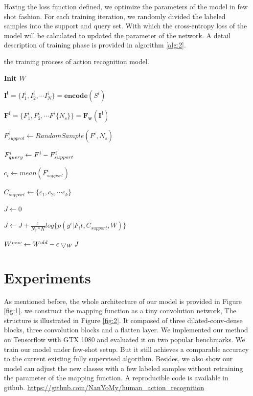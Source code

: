 \documentclass{bmvc2k}
\begin{document}
 Having the loss function defined, we optimize the parameters of the model in few shot fashion. For each training iteration, we randomly divided the labeled samples into the support and query set. With which the cross-entropy loss of the model will be calculated to updated the parameter of the network. A detail description of training phase is provided in algorithm \ref{alg:2}.


\begin{algorithm}[htb]
	\caption{the training process of action recognition model.}
	\label{alg:2}
	\bf{Init $W$}

	
	\Repeat{}
	{
		{
			$\mathbf{I^i}=\{I^i_1,I^i_2,\cdots I^i_N\}=\mathbf{encode}(S^i)$
			
			$\mathbf{F^i}=\{F^i_1,F^i_2,\cdots F^i \{ N_s \} \}=\mathbf{F_w(I^i)}$
		}	
		{
			$F^i_{supprot}\leftarrow RandomSample(F^i,N_s)$
			
			$F^i_{query}\leftarrow F^i\-- F^i_{support}$
			
			$c_i\leftarrow mean(F^i_{support})$
		}
		$C_{support}\leftarrow \{c_1,c_2,\cdots c_k\}$
		
		$J\leftarrow0$
		
		{
			{
				
				$J\leftarrow J+ \frac{1}{N_q*K}log\{p(y^i|F_it,C_{support},W)\}$
			}	
		}
		$W^{new}\leftarrow W^{old}\-- \epsilon\bigtriangledown_W J$
	}
\end{algorithm}







\section{Experiments}
As mentioned before, the whole architecture of our model is provided in Figure \ref{fig:1}. we construct the mapping function as a tiny convolution network, The structure is illustrated in Figure \ref{fig:2}. It composed of three dilated-conv-dense blocks, three convolution blocks and a flatten layer. We implemented our method on Tensorflow with GTX 1080 and evaluated it on two popular benchmarks. We train our model under few-shot setup. But it still achieves a comparable accuracy to the current existing fully supervised algorithm. Besides, we also show our model can adjust the new classes with a few labeled samples without retraining the parameter of the mapping function. A reproducible code is available in github. \url{https://github.com/NanYoMy/human_action_recognition}
\end{document}
